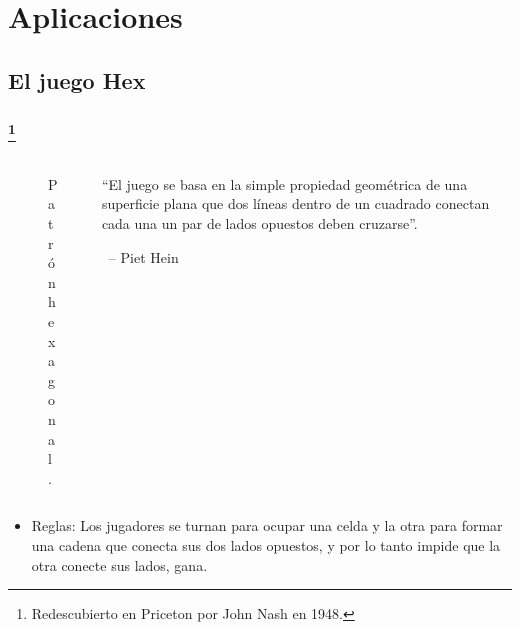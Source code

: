 \documentclass[spanish, utf8,handout]{beamer} %
\theoremstyle{definition}
\begin{document}
\section{Aplicaciones}

\subsection{El juego Hex}

\begin{frame}\transblindsvertical
\frametitle{\insertsubsection\footnote{Redescubierto en Priceton por John Nash en 1948.}}

\begin{columns}[t]
	\begin{column}{.4\textwidth}
			\begin{figure}[ht]
				\scalebox{.32}{}
				\caption{Patrón hexagonal.}
			\end{figure}%
	\end{column}
	\begin{column}{.38\textwidth}
		\begin{flushleft}
		``El juego se basa en la simple propiedad geométrica de una superficie plana que dos líneas dentro de un cuadrado conectan cada una un par de lados opuestos deben cruzarse''.
		\end{flushleft}
		\		
		-- Piet Hein
	\end{column}
\end{columns}

\vspace*{5pt}

\begin{itemize}
	\item Reglas: Los jugadores se turnan para ocupar una celda y la otra para formar una cadena que conecta sus dos lados opuestos, y por lo tanto impide que la otra conecte sus lados, gana.
\end{itemize}
\end{frame}
\end{document}
